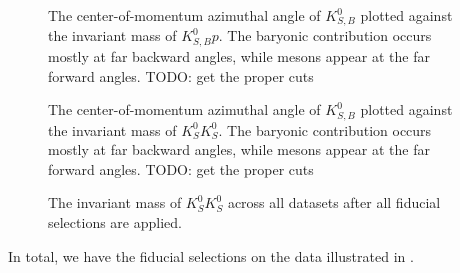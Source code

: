 \begin{figure}
  \begin{center}
    
  \end{center}
  \caption{The center-of-momentum azimuthal angle of $K_{S,B}^0$ plotted against the invariant mass of $K_{S,B}^0 p$. The baryonic contribution occurs mostly at far backward angles, while mesons appear at the far forward angles. {\color{red}TODO: get the proper cuts}}\label{fig:ksb-costheta-v-baryon-mass-data-pz-masscut-chisqdof-3.0}
\end{figure}

\begin{figure}
  \begin{center}
    
  \end{center}
  \caption{The center-of-momentum azimuthal angle of $K_{S,B}^0$ plotted against the invariant mass of $K_S^0K_S^0$. The baryonic contribution occurs mostly at far backward angles, while mesons appear at the far forward angles. {\color{red}TODO: get the proper cuts}}\label{fig:ksb-costheta-v-meson-mass-data-pz-masscut-chisqdof-3.0}
\end{figure}

\begin{figure}
  \begin{center}
    
  \end{center}
  \caption{The invariant mass of $K_S^0K_S^0$ across all datasets after all fiducial selections are applied.}\label{fig:meson-mass-data-pz-masscut-chisqdof-3.0-mesons}
\end{figure}

%     

In total, we have the fiducial selections on the data illustrated in .

